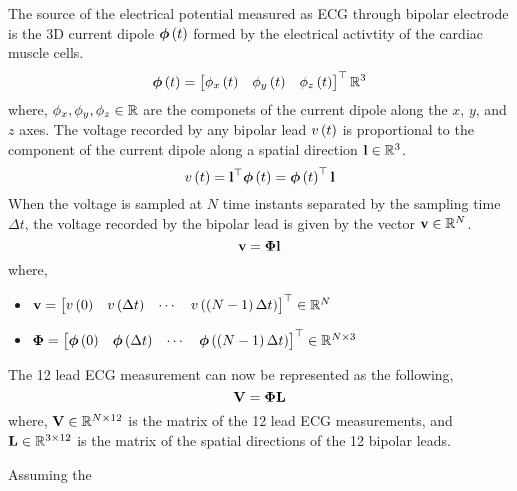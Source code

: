 \documentclass[12pt]{article}
\def\mf{\ensuremath\mathbf}
\def\mb{\ensuremath\mathbb}
\def\lp{\ensuremath\left(}
\def\rp{\ensuremath\right)}
\def\bmx{\ensuremath\begin{bmatrix*}[r]}
\def\emx{\ensuremath\end{bmatrix*}}
\def\bmxc{\ensuremath\begin{bmatrix*}[c]}
\newcommand{\ct}[1]{\lp #1\rp}
\begin{document}
\begin{enumerate}
    The source of the electrical potential measured as ECG through bipolar electrode is the 3D current dipole $\bm{\phi}\ct{t}$ formed by the electrical activtity of the cardiac muscle cells. 
    \[ \bm{\phi}\ct{t} = \bmx \phi_x\ct{t} & \phi_y\ct{t} & \phi_z\ct{t}\emx^\top \mb{R}^3 \]
    where, $\phi_x, \phi_y, \phi_z \in\mb{R}$ are the componets of the current dipole along the $x$, $y$, and $z$ axes. The voltage recorded by any bipolar lead $v\ct{t}$ is proportional to the component of the current dipole along a spatial direction $\mf{l} \in\mb{R}^3$.
    \[ v\ct{t} = \mf{l}^\top \bm{\phi}\ct{t} = \bm{\phi}\ct{t}^\top\mf{l} \]
    When the voltage is sampled at $N$ time instants separated by the sampling time $\Delta t$, the voltage recorded by the bipolar lead is given by the vector $\mf{v} \in\mb{R}^N$.
    \[ \mf{v} = \bm{\Phi} \mf{l} \]
    where, 
    \begin{itemize}
        \item $\mf{v} = \bmxc v\ct{0} & v\ct{\Delta t} & \cdots & v\ct{\ct{N-1}\Delta t} \emx^\top \in \mb{R}^N$
        \item $\bm{\Phi} =\bmx \bm{\phi}\ct{0} & \bm{\phi}\ct{\Delta t} & \cdots & \bm{\phi}\ct{\ct{N - 1}\Delta t} \emx^\top \in \mb{R}^{N \times 3}$
    \end{itemize}
    The 12 lead ECG measurement can now be represented as the following,
    \[ \mf{V} = \bm{\Phi} \mf{L} \]
    where, $\mf{V} \in \mb{R}^{N \times 12}$ is the matrix of the 12 lead ECG measurements, and $\mf{L} \in \mb{R}^{3 \times 12}$ is the matrix of the spatial directions of the 12 bipolar leads. 

    Assuming the 
    
    

\end{enumerate}
\end{document}
